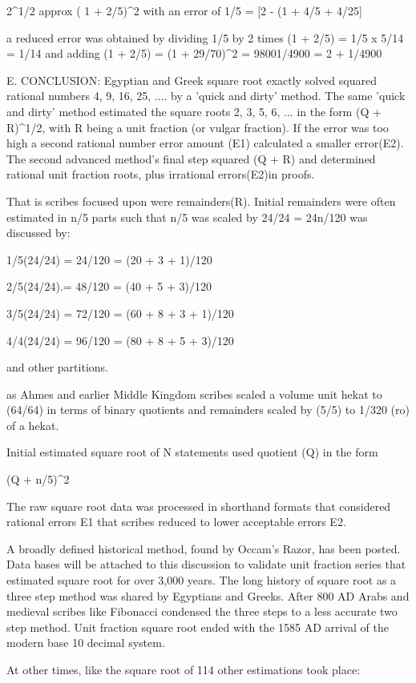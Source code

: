 \documentclass[12pt]{article}
\begin{document}
{2^1/2 approx ( 1 + 2/5)^2 with an error of 1/5 = [2 - (1 + 4/5 + 4/25] 

a reduced error was obtained by dividing 1/5 by 2 times (1 + 2/5) = 1/5 x 5/14 = 1/14
and adding (1 + 2/5) = (1 + 29/70)^2 = 98001/4900 = 2 + 1/4900

E. CONCLUSION: Egyptian and Greek square root exactly solved squared rational numbers 4, 9, 16, 25, .... by
a 'quick and dirty' method. The same 'quick and dirty' method estimated the square roots 2, 3, 5, 6, ...   in the form (Q + R)^1/2, with R being a unit fraction (or vulgar fraction). If the error was too high a second rational number error amount (E1) calculated a smaller error(E2). The second advanced method's final step squared (Q + R) and determined rational unit fraction roots, plus  irrational errors(E2)in proofs.

That is scribes focused upon were remainders(R). Initial remainders were often estimated in  n/5 parts such that n/5 was scaled by 24/24 = 24n/120 was discussed by:


1/5(24/24) = 24/120 = (20 + 3 + 1)/120

2/5(24/24).= 48/120 = (40 + 5 + 3)/120

3/5(24/24) = 72/120 = (60 + 8 + 3 + 1)/120

4/4(24/24) = 96/120 = (80 + 8 + 5 + 3)/120

and other partitions.

as Ahmes and earlier Middle Kingdom scribes scaled a volume unit hekat to (64/64) in terms of binary quotients and remainders scaled by (5/5) to 1/320 (ro) of a hekat.

Initial estimated square root of N statements used quotient (Q) in the form

(Q + n/5)^2

The raw square root data was processed in shorthand formats that considered rational errors E1 that scribes reduced to lower acceptable errors E2.

A broadly defined historical method, found by Occam's Razor, has been posted. Data bases will be attached to this discussion to validate unit fraction series that estimated square root for over 3,000 years. The long history of square root as a three step method was shared by Egyptians and Greeks. After 800 AD Arabs and medieval scribes like Fibonacci condensed the three steps to a less accurate two step method. Unit fraction square root ended with the 1585 AD arrival of the modern base 10 decimal system. 

At other times, like the square root of 114 other estimations took place:

}
\end{document}
